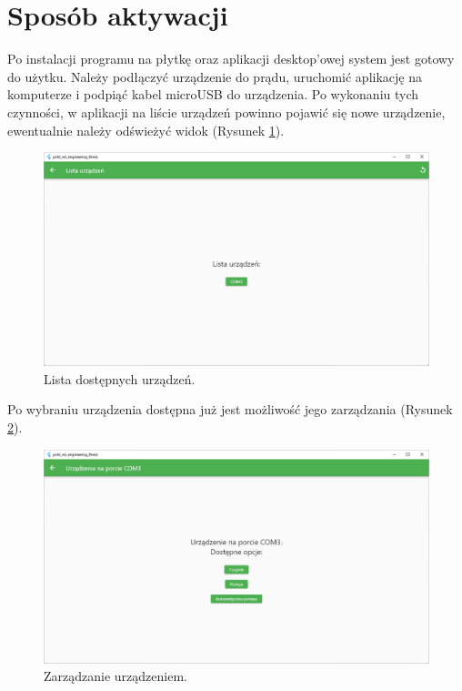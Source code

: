 \documentclass[a4paper,twoside,12pt]{book}
\begin{document}
\section{Sposób aktywacji}

Po instalacji programu na płytkę oraz aplikacji desktop'owej system jest gotowy do użytku. Należy podłączyć urządzenie do prądu, uruchomić aplikację na komputerze i podpiąć kabel microUSB do urządzenia. Po wykonaniu tych czynności, w aplikacji na liście urządzeń powinno pojawić się nowe urządzenie, ewentualnie należy odświeżyć widok (Rysunek \ref{fig:14}).

\begin{figure}[H]
   \centering
   \includegraphics[width=\textwidth]{./assets/img/img014.png}
   \caption{Lista dostępnych urządzeń.}
   \label{fig:14}
\end{figure}

\newpage

Po wybraniu urządzenia dostępna już jest możliwość jego zarządzania (Rysunek \ref{fig:15}).

\begin{figure}[H]
   \centering
   \includegraphics[width=\textwidth]{./assets/img/img015.png}
   \caption{Zarządzanie urządzeniem.}
   \label{fig:15}
\end{figure}
\end{document}
